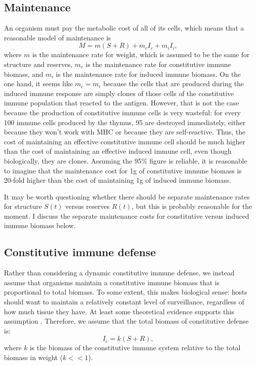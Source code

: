 \documentclass[12pt,reqno,final,pdftex]{amsart}\usepackage[]{graphicx}\usepackage[]{color}
\theoremstyle{plain}
\numberwithin{equation}{part}
\begin{document}
\subsection*{Maintenance}
An organism must pay the metabolic cost of all of its cells, which means that a reasonable model of maintenance is
\begin{equation}
M=m(S+R)+m_cI_c+m_iI_i,
\end{equation}
where $m$ is the maintenance rate for weight, which is assumed to be the same for structure and reserves, $m_c$ is the maintenance rate for constitutive immune biomass, and $m_i$ is the maintenance rate for induced immune biomass.
On the one hand, it seems like $m_c=m_i$ because the cells that are produced during the induced immune response are simply clones of those cells of the constitutive immune population that reacted to the antigen.
However, that is not the case because the production of constitutive immune cells is very wasteful: for every 100 immune cells produced by the thymus, 95 are destroyed immediately, either because they won't work with MHC or because they are self-reactive.
Thus, the cost of maintaining an effective constitutive immune cell should be much higher than the cost of maintaining an effective induced immune cell, even though biologically, they are clones.
Assuming the 95\% figure is reliable, it is reasonable to imagine that the maintenance cost for 1g of constitutive immune biomass is 20-fold higher than the cost of maintaining 1g of induced immune biomass.

It may be worth questioning whether there should be separate maintenance rates for structure $S(t)$ versus reserves $R(t)$, but this is probably reasonable for the moment.
I discuss the separate maintenance costs for constitutive versus induced immune biomass below.

\subsection*{Constitutive immune defense}
Rather than considering a dynamic constitutive immune defense, we instead assume that organisms maintain a constitutive immune biomass that is proportional to total biomass.
To some extent, this makes biological sense: hosts should want to maintain a relatively constant level of surveillance, regardless of how much tissue they have.
At least some theoretical evidence supports this assumption \citep{Wiegel2004}.
Therefore, we assume that the total biomass of constitutive defense is:
\begin{equation}
I_c=k(S+R),
\end{equation}
where $k$ is the biomass of the constitutive immune system relative to the total biomass in weight ($k<<1$).
\end{document}

